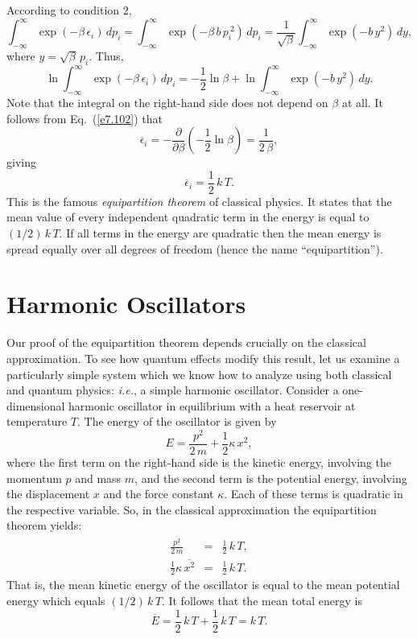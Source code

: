 According to condition 2,
\begin{equation}
\int_{-\infty}^{\infty} \exp(-\beta\, \epsilon_i)\, dp_i = 
\int_{-\infty}^{\infty} \exp(-\beta\, b\, p_i^{~2})\, dp_i=
\frac{1}{\sqrt{\beta}} \int_{-\infty}^{\infty} \exp(- b\, y^2)\, dy,
\end{equation}
where $ y = \sqrt{\beta} \,p_i$. Thus,
\begin{equation}
\ln \int_{-\infty}^{\infty} \exp(-\beta\, \epsilon_i)\, dp_i = - \frac{1}{2} \ln \beta
+ \ln \int_{-\infty}^{\infty} \exp(- b \,y^2)\, dy.
\end{equation}
Note that the integral on the right-hand side does not depend on $\beta$ at all. It follows
from Eq.~(\ref{e7.102}) that
\begin{equation}
\overline{\epsilon}_i = - \frac{\partial}{\partial \beta} \left( - \frac{1}{2}
\ln \beta\right) = \frac{1}{2\,\beta},
\end{equation}
giving
\begin{equation}
\overline{\epsilon}_i = \frac{1}{2}\, k\, T.
\end{equation}
This is the famous {\em equipartition theorem}\/ of classical physics. 
It states that the mean value of every independent
quadratic term in the energy is equal to $(1/2)\, k\,T$. If all terms in the energy are quadratic
then the mean energy is spread equally over all degrees of freedom (hence the 
name ``equipartition'').

\section{Harmonic Oscillators}\label{s7.10}
Our proof of the equipartition theorem depends crucially on the classical approximation. To see how
quantum effects modify this result, let us examine a particularly simple system
which we know how to analyze using both classical and quantum physics: {\em i.e.},
 a
simple  harmonic oscillator. Consider a one-dimensional harmonic oscillator in equilibrium
with a heat reservoir at temperature $T$. The energy of the oscillator is given by
\begin{equation}
E  = \frac{p^2}{2\,m} + \frac{1}{2}\kappa\, x^2,
\end{equation}
where the first term on the right-hand side is the kinetic energy, involving the momentum
$p$ and mass $m$, and the second term is the potential energy, involving the displacement
$x$ and the force constant $\kappa$. Each of these terms is quadratic in the respective
variable. So, in the classical approximation the equipartition theorem yields:
\begin{eqnarray}
 \frac{\overline{p^2}}{2\,m}&= &\frac{1}{2}\, k\,T, \\[0.5ex]
 \frac{1}{2}\kappa \,\overline{x^2}&= &\frac{1}{2} \,k\,T.
\end{eqnarray}
That is, the mean kinetic energy of the oscillator is equal
to the mean potential energy which
equals $(1/2)\,k\,T$. It follows that the mean total energy is
\begin{equation}
\overline{E} = \frac{1}{2}\, k\,T + \frac{1}{2}\, k\,T = k\,T.\label{e7.109}
\end{equation}

